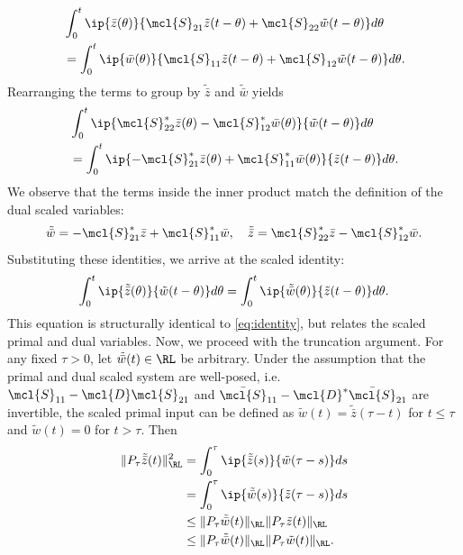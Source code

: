\begin{equation*}
	\begin{aligned}
		 & \int_0^t\ip{\bar{z}(\theta)}{\mcl{S}_{21}\tilde{z}(t-\theta) + \mcl{S}_{22}\tilde{w}(t-\theta)}d\theta    \\
		 & = \int_0^t\ip{\bar{w}(\theta)}{\mcl{S}_{11}\tilde{z}(t-\theta) + \mcl{S}_{12}\tilde{w}(t-\theta)}d\theta.
	\end{aligned}
\end{equation*}
Rearranging the terms to group by $\tilde{\bar{z}}$ and $\tilde{\bar{w}}$ yields
\begin{equation*}
	\begin{aligned}
		 & \int_0^t \ip{\mcl{S}^*_{22}\bar{z}(\theta) - \mcl{S}^*_{12}\bar{w}(\theta)}{\tilde{w}(t-\theta)} d\theta     \\
		 & = \int_0^t \ip{-\mcl{S}^*_{21}\bar{z}(\theta) + \mcl{S}^*_{11}\bar{w}(\theta)}{\tilde{z}(t-\theta)} d\theta.
	\end{aligned}
\end{equation*}
We observe that the terms inside the inner product match the definition of the dual scaled variables:
\begin{equation*}
	\tilde{\bar{w}} = -\mcl{S}_{21}^*\bar{z} + \mcl{S}_{11}^*\bar{w}, \quad \tilde{\bar{z}} = \mcl{S}_{22}^*\bar{z} - \mcl{S}^*_{12}\bar{w}.
\end{equation*}
Substituting these identities, we arrive at the scaled identity:
\begin{equation}\label{eqn:scaled_equivalence}
	\int_0^t\ip{\tilde{\bar{z}}(\theta)}{\tilde{w}(t-\theta)} d\theta = \int_0^t\ip{\tilde{\bar{w}}(\theta)}{\tilde{z}(t-\theta)} d\theta.
\end{equation}
This equation is structurally identical to \eqref{eq:identity}, but relates the scaled primal and dual variables. Now, we proceed with the truncation argument. For any fixed $\tau > 0$, let $\tilde{\bar{w}}(t)\in\RL$ be arbitrary. Under the assumption that the primal and dual scaled system are well-posed, i.e. {$\mcl{S}_{11} - \mcl{D}\mcl{S}_{21}$ and $\bar{\mcl{S}}_{11} - \mcl{D}^*\bar{\mcl{S}}_{21}$} are invertible, the scaled primal input can be defined as $\tilde{w}(t) = \tilde{\bar{z}}(\tau - t)$ for $t \leq \tau$ and $\tilde{w}(t) = 0$ for $t > \tau$. Then
\begin{equation*}
	\begin{aligned}
		\| P_{\tau}\tilde{\bar{z}}(t) \|_{\RL}^2 & = \int_{0}^{\tau} \ip{\tilde{\bar{z}}(s)}{\tilde{w}(\tau-s)} ds              \\&= \int_{0}^{\tau} \ip{\tilde{\bar{w}}(s)}{\tilde{z}(\tau-s)} ds \\
		                                         & \leq \| P_{\tau}\tilde{\bar{w}}(t) \|_{\RL} \| P_{\tau}\tilde{z}(t) \|_{\RL} \\&\leq \| P_{\tau}\tilde{\bar{w}}(t) \|_{\RL} \| P_{\tau}\tilde{w}(t) \|_{\RL}.
	\end{aligned}
\end{equation*}
